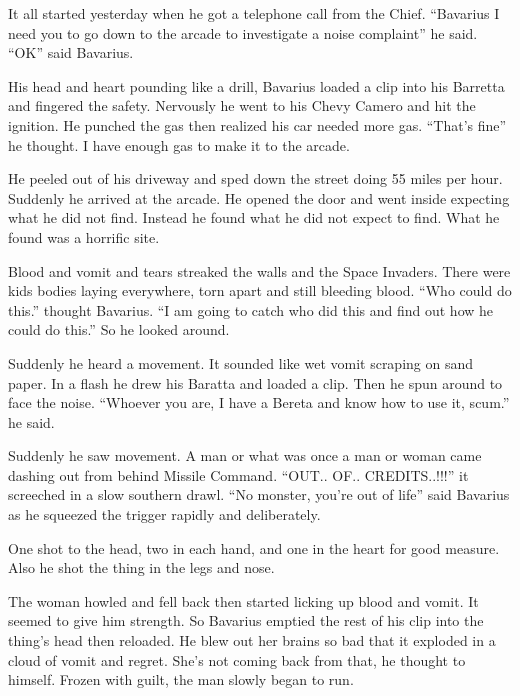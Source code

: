 It all started yesterday when he got a telephone call from the
Chief. ``Bavarius I need you to go down to the arcade to investigate
a noise complaint'' he said. ``OK'' said Bavarius.



His head and heart pounding like a drill, Bavarius loaded a clip
into his Barretta and fingered the safety. Nervously he went to his
Chevy Camero and hit the ignition. He punched the gas then realized
his car needed more gas. ``That's fine'' he thought. I have enough
gas to make it to the arcade.



He peeled out of his driveway and sped down the street doing 55
miles per hour. Suddenly he arrived at the arcade. He opened the
door and went inside expecting what he did not find. Instead he
found what he did not expect to find. What he found was a horrific
site.



Blood and vomit and tears streaked the walls and the Space
Invaders. There were kids bodies laying everywhere, torn apart and
still bleeding blood. ``Who could do this.'' thought Bavarius. ``I am
going to catch who did this and find out how he could do this.'' So
he looked around.



Suddenly he heard a movement. It sounded like wet vomit scraping on
sand paper. In a flash he drew his Baratta and loaded a clip. Then
he spun around to face the noise. ``Whoever you are, I have a Bereta
and know how to use it, scum.'' he said.



Suddenly he saw movement. A man or what was once a man or woman
came dashing out from behind Missile Command. ``OUT.. OF..
CREDITS..!!!'' it screeched in a slow southern drawl. ``No monster,
you're out of life'' said Bavarius as he squeezed the trigger
rapidly and deliberately.



One shot to the head, two in each hand, and one in the heart for
good measure. Also he shot the thing in the legs and nose.



The woman howled and fell back then started licking up blood and
vomit. It seemed to give him strength. So Bavarius emptied the rest
of his clip into the thing's head then reloaded. He blew out her
brains so bad that it exploded in a cloud of vomit and regret.
She's not coming back from that, he thought to himself. Frozen with
guilt, the man slowly began to run.



